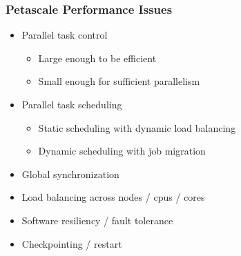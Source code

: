 \begin{frame}[fragile] \frametitle{Petascale Performance Issues}
   \begin{itemize}
      \item Parallel task control
      \begin{itemize}
          \item Large enough to be efficient
          \item Small enough for sufficient parallelism
      \end{itemize}
      \item Parallel task scheduling
      \begin{itemize}
          \item Static scheduling with dynamic load balancing
          \item Dynamic scheduling with job migration
      \end{itemize}
      \item Global synchronization
      \item Load balancing across nodes / cpus / cores
      \item Software resiliency / fault tolerance
      \item Checkpointing / restart
   \end{itemize}
\end{frame}
